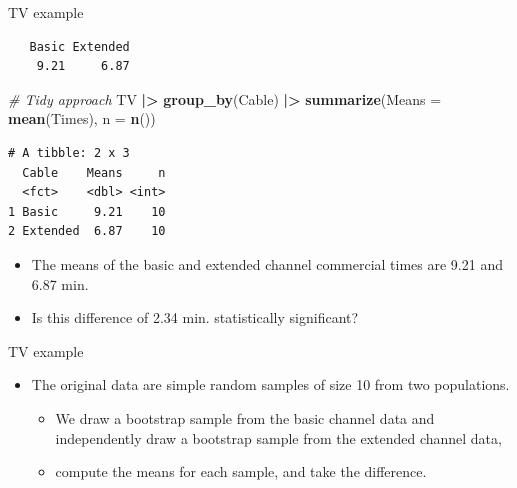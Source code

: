 \documentclass[
  ignorenonframetext,
]{beamer}
\newenvironment{Shaded}{\begin{snugshade}}{\end{snugshade}}
\newcommand{\AttributeTok}[1]{\textcolor[rgb]{0.13,0.29,0.53}{#1}}
\newcommand{\CommentTok}[1]{\textcolor[rgb]{0.56,0.35,0.01}{\textit{#1}}}
\newcommand{\FunctionTok}[1]{\textcolor[rgb]{0.13,0.29,0.53}{\textbf{#1}}}
\newcommand{\NormalTok}[1]{#1}
\newcommand{\OtherTok}[1]{\textcolor[rgb]{0.56,0.35,0.01}{#1}}
\newcommand{\SpecialCharTok}[1]{\textcolor[rgb]{0.81,0.36,0.00}{\textbf{#1}}}
\providecommand{\tightlist}{%
  \setlength{\itemsep}{0pt}\setlength{\parskip}{0pt}}
\begin{document}
\begin{frame}[fragile]{TV example}
\label{tv-example-1}
\small

\begin{Shaded}
\end{Shaded}

\begin{verbatim}
   Basic Extended 
    9.21     6.87 
\end{verbatim}

\begin{Shaded}
\begin{Highlighting}[]
\CommentTok{\# Tidy approach}
\NormalTok{TV }\SpecialCharTok{|\textgreater{}}
  \FunctionTok{group\_by}\NormalTok{(Cable) }\SpecialCharTok{|\textgreater{}}
  \FunctionTok{summarize}\NormalTok{(}\AttributeTok{Means =} \FunctionTok{mean}\NormalTok{(Times), }\AttributeTok{n =} \FunctionTok{n}\NormalTok{())}
\end{Highlighting}
\end{Shaded}

\begin{verbatim}
# A tibble: 2 x 3
  Cable    Means     n
  <fct>    <dbl> <int>
1 Basic     9.21    10
2 Extended  6.87    10
\end{verbatim}

\normalsize

\begin{itemize}
\item
  The means of the basic and extended channel commercial times are 9.21
  and 6.87 min.
\item
  Is this difference of 2.34 min. statistically significant?
\end{itemize}
\end{frame}

\begin{frame}{TV example}
\label{tv-example-2}
\begin{itemize}
\item
  The original data are simple random samples of size 10 from two
  populations.

  \begin{itemize}
  \tightlist
  \item
    We draw a bootstrap sample from the basic channel data and
    independently draw a bootstrap sample from the extended channel
    data,
  \item
    compute the means for each sample, and take the difference.
  \end{itemize}
\end{itemize}
\end{frame}
\end{document}
